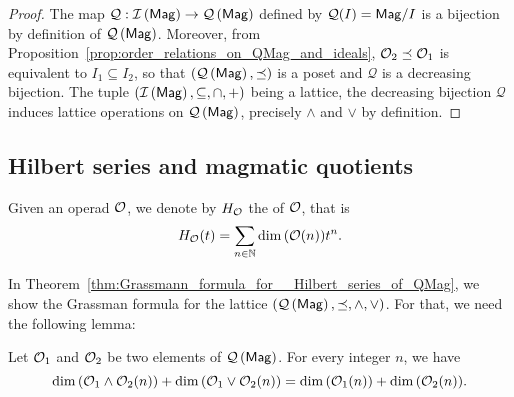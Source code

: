 \begin{proof}
  The map $\mathcal{Q}:\mathcal{I}\left(\mathsf{Mag}\right)\to\mathcal{Q}\left(\mathsf{Mag}\right)$ defined by $\mathcal{Q}(I)=\mathsf{Mag}/I$
  is a bijection by definition of $\mathcal{Q}\left(\mathsf{Mag}\right)$. Moreover, from
  Proposition~\ref{prop:order_relations_on_QMag_and_ideals},
  $\mathcal{O}_2\preceq\mathcal{O}_1$ is equivalent to $I_1\subseteq I_2$, so that
  $\left(\mathcal{Q}\left(\mathsf{Mag}\right),\preceq\right)$ is a poset and $\mathcal{Q}$ is a
  decreasing bijection. The tuple $\left(\mathcal{I}\left(\mathsf{Mag}\right),\subseteq,\cap,+\right)$
  being a lattice, the decreasing bijection $\mathcal{Q}$ induces
  lattice operations on $\mathcal{Q}\left(\mathsf{Mag}\right)$, precisely $\wedge$ and $\vee$ by
  definition.
\end{proof}


\subsection{Hilbert series and magmatic quotients}

Given an operad $\mathcal{O}$, we denote by $H_{\mathcal{O}}$ the  of $\mathcal{O}$, that is
\begin{equation} \label{equ:definition_of_Hilbert_series}
  H_{\mathcal{O}}(t)=\sum_{n\in\mathbb{N}}\dim{\left(\mathcal{O}(n)\right)}t^n.
\end{equation}

In Theorem~\ref{thm:Grassmann_formula_for__Hilbert_series_of_QMag}, we show the Grassman formula for the lattice $\left(\mathcal{Q}\left(\mathsf{Mag}\right),\preceq,\wedge,\vee\right)$. For that, we need the following lemma:

\begin{Lemma} \label{lem:lattice_structure_and_coefficients_of_Hiblert_series}
  Let $\mathcal{O}_1$ and $\mathcal{O}_2$ be two elements of $\mathcal{Q}\left(\mathsf{Mag}\right)$. For every integer $n$, we have
  \begin{equation} \label{equ:lattice_structure_and_coefficients_of_the_Hiblert_series}
    \dim{\left(\mathcal{O}_1\wedge\mathcal{O}_2(n)\right)}+\dim{\left(\mathcal{O}_1\vee\mathcal{O}_2(n)\right)}=\dim{\left(\mathcal{O}_1(n)\right)}+\dim{\left(\mathcal{O}_2(n)\right)}.    \end{equation}
\end{Lemma}


